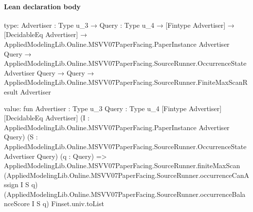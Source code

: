 \documentclass[10pt]{article}
\begin{document}
\paragraph{Lean declaration body}
\begin{ReviewVerbatim}
type:
{Advertiser : Type u_3} →
  {Query : Type u_4} →
    [Fintype Advertiser] →
      [DecidableEq Advertiser] →
        AppliedModelingLib.Online.MSVV07PaperFacing.PaperInstance Advertiser Query →
          AppliedModelingLib.Online.MSVV07PaperFacing.SourceRunner.OccurrenceState Advertiser Query →
            Query → AppliedModelingLib.Online.MSVV07PaperFacing.SourceRunner.FiniteMaxScanResult Advertiser

value:
fun {Advertiser : Type u_3} {Query : Type u_4} [Fintype Advertiser] [DecidableEq Advertiser]
    (I : AppliedModelingLib.Online.MSVV07PaperFacing.PaperInstance Advertiser Query)
    (S : AppliedModelingLib.Online.MSVV07PaperFacing.SourceRunner.OccurrenceState Advertiser Query) (q : Query) =>
  AppliedModelingLib.Online.MSVV07PaperFacing.SourceRunner.finiteMaxScan
    (AppliedModelingLib.Online.MSVV07PaperFacing.SourceRunner.occurrenceCanAssign I S q)
    (AppliedModelingLib.Online.MSVV07PaperFacing.SourceRunner.occurrenceBalanceScore I S q) Finset.univ.toList
\end{ReviewVerbatim}
\end{document}
